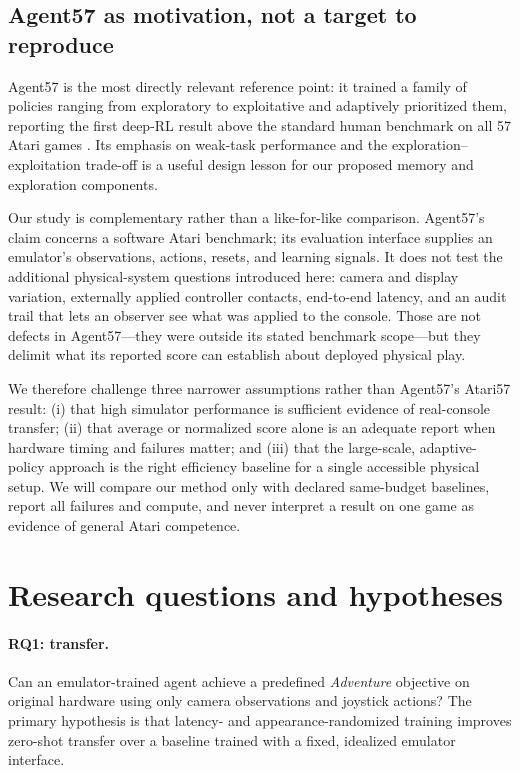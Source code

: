 \documentclass[11pt]{article}
\begin{document}
\subsection{Agent57 as motivation, not a target to reproduce}

Agent57 is the most directly relevant reference point: it trained a family of
policies ranging from exploratory to exploitative and adaptively prioritized
them, reporting the first deep-RL result above the standard human benchmark on
all 57 Atari games \cite{badia2020agent57}.  Its emphasis on weak-task
performance and the exploration--exploitation trade-off is a useful design
lesson for our proposed memory and exploration components.

Our study is complementary rather than a like-for-like comparison.  Agent57's
claim concerns a software Atari benchmark; its evaluation interface supplies
an emulator's observations, actions, resets, and learning signals.  It does
not test the additional physical-system questions introduced here: camera and
display variation, externally applied controller contacts, end-to-end latency,
and an audit trail that lets an observer see what was applied to the console.
Those are not defects in Agent57---they were outside its stated benchmark
scope---but they delimit what its reported score can establish about deployed
physical play.

We therefore challenge three narrower assumptions rather than Agent57's
Atari57 result: (i) that high simulator performance is sufficient evidence of
real-console transfer; (ii) that average or normalized score alone is an
adequate report when hardware timing and failures matter; and (iii) that the
large-scale, adaptive-policy approach is the right efficiency baseline for a
single accessible physical setup.  We will compare our method only with
declared same-budget baselines, report all failures and compute, and never
interpret a result on one game as evidence of general Atari competence.

\section{Research questions and hypotheses}

\paragraph{RQ1: transfer.} Can an emulator-trained agent achieve a predefined
\emph{Adventure} objective on original hardware using only camera observations
and joystick actions?  The primary hypothesis is that latency- and
appearance-randomized training improves zero-shot transfer over a baseline
trained with a fixed, idealized emulator interface.
\end{document}
